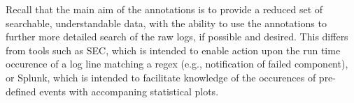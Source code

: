 Recall that the main aim of the annotations
is to provide a reduced set of searchable, understandable data, with the
ability to use the annotations to further more detailed search of the raw
logs, if possible and desired. This differs from tools
such as SEC, which is intended to enable action upon the run time
occurence of a log line matching a regex (e.g., notification
of failed component), or Splunk, which is intended
to facilitate knowledge of the occurences of pre-defined
events with accompaning statistical plots.








